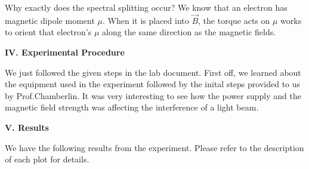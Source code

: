 \documentclass[fleqn]{article}
\begin{document}
  Why exactly does the spectral splitting occur? We know that an electron has magnetic dipole moment $\mu$. When it is placed into 
  $\overrightarrow{B}$, the torque acts on $\mu$ works to orient that electron's $\mu$ along the same direction as the magnetic fields.


  \vspace{20px}

  \textbf{IV. Experimental Procedure}

  \vspace{10px}

  We just followed the given steps in the
  lab document. First off, we learned about the equipment used in the experiment followed by the inital steps provided to us by 
  Prof.Chamberlin. It was very interesting to see how the power supply and the magnetic field strength was affecting the interference 
  of a light beam. \textcite{Five}

  \vspace{20px}

  \textbf{V. Results}

  \vspace{10px}

  We have the following results from the experiment. Please refer to the description of each plot for details.
  \vspace{20px}
\end{document}
